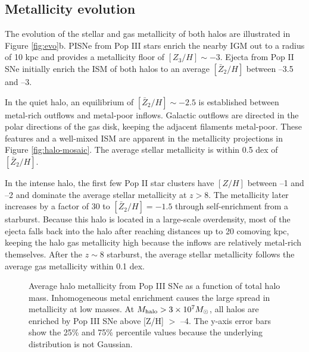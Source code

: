 \documentclass[12pt,preprint]{aastex}
\begin{document}
\subsection{Metallicity evolution}

The evolution of the stellar and gas metallicity of both halos are
illustrated in Figure \ref{fig:evo}b.  PISNe from Pop III stars enrich
the nearby IGM out to a radius of 10 kpc and provides a metallicity
floor of $[Z_3/H] \sim -3$.  Ejecta from Pop II SNe initially enrich
the ISM of both halos to an average $[\bar{Z}_2/H]$ between --3.5 and
--3.

In the quiet halo, an equilibrium of $[\bar{Z}_2/H] \sim -2.5$ is
established between metal-rich outflows and metal-poor inflows.
Galactic outflows are directed in the polar directions of the gas
disk, keeping the adjacent filaments metal-poor.  These features and a
well-mixed ISM \citep[cf.][]{Wise08_Gal, Greif10} are apparent in the
metallicity projections in Figure \ref{fig:halo-mosaic}.  The average
stellar metallicity is within 0.5 dex of $[\bar{Z}_2/H]$.

In the intense halo, the first few Pop II star clusters have $[Z/H]$
between --1 and --2 and dominate the average stellar metallicity at $z
> 8$.  The metallicity later increases by a factor of 30 to
$[\bar{Z}_2/H] = -1.5$ through self-enrichment from a starburst.
Because this halo is located in a large-scale overdensity, most of the
ejecta falls back into the halo after reaching distances up to 20
comoving kpc, keeping the halo gas metallicity high because the
inflows are relatively metal-rich themselves.  After the $z \sim 8$
starburst, the average stellar metallicity follows the average gas
metallicity within 0.1 dex.


\begin{figure}
\caption{\label{fig:z3} Average halo metallicity from Pop III SNe as a
  function of total halo mass.  Inhomogeneous metal enrichment causes
  the large spread in metallicity at low masses.  At $M_{\rm halo} > 3
  \times 10^7 \Ms$, all halos are enriched by Pop III SNe above [Z/H]
  $>$ --4.  The y-axis error bars show the 25\% and 75\% percentile
  values because the underlying distribution is not Gaussian.}
\end{figure}

\end{document}
